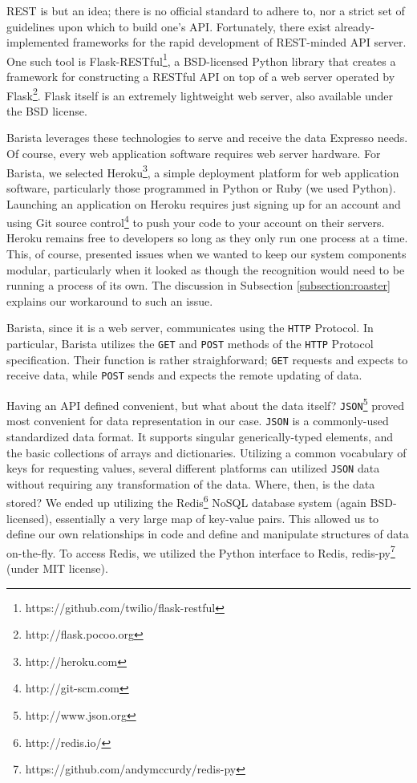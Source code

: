 \documentclass{acm_proc_article-sp}
\begin{document}
REST is but an idea; there is no official standard to adhere to, nor a strict set of guidelines upon which to build one's API. Fortunately, there exist already-implemented frameworks for the rapid development of REST-minded API server. One such tool is Flask-RESTful\footnote{https://github.com/twilio/flask-restful}, a BSD-licensed Python library that creates a framework for constructing a RESTful API on top of a web server operated by Flask\footnote{http://flask.pocoo.org}. Flask itself is an extremely lightweight web server, also available under the BSD license.

Barista leverages these technologies to serve and receive the data Expresso needs. Of course, every web application software requires web server hardware. For Barista, we selected Heroku\footnote{http://heroku.com}, a simple deployment platform for web application software, particularly those programmed in Python or Ruby (we used Python). Launching an application on Heroku requires just signing up for an account and using Git source control\footnote{http://git-scm.com} to push your code to your account on their servers. Heroku remains free to developers so long as they only run one process at a time. This, of course, presented issues when we wanted to keep our system components modular, particularly when it looked as though the recognition would need to be running a process of its own. The discussion in Subsection \ref{subsection:roaster} explains our workaround to such an issue.

Barista, since it is a web server, communicates using the \texttt{HTTP} Protocol. In particular, Barista utilizes the \texttt{GET} and \texttt{POST} methods of the \texttt{HTTP} Protocol specification. Their function is rather straighforward; \texttt{GET} requests and expects to receive data, while \texttt{POST} sends and expects the remote updating of data. 

Having an API defined convenient, but what about the data itself? \texttt{JSON}\footnote{http://www.json.org} proved most convenient for data representation in our case. \texttt{JSON} is a commonly-used standardized data format. It supports singular generically-typed elements, and the basic collections of arrays and dictionaries. Utilizing a common vocabulary of keys for requesting values, several different platforms can utilized \texttt{JSON} data without requiring any transformation of the data. Where, then, is the data stored? We ended up utilizing the Redis\footnote{http://redis.io/} NoSQL database system (again BSD-licensed), essentially a very large map of key-value pairs. This allowed us to define our own relationships in code and define and manipulate structures of data on-the-fly. To access Redis, we utilized the Python interface to Redis, redis-py\footnote{https://github.com/andymccurdy/redis-py} (under MIT license).
\end{document}
